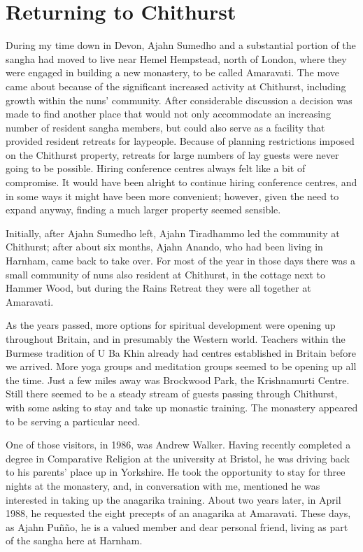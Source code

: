 \chapter{Returning to Chithurst}

During my time down in Devon, Ajahn Sumedho and a substantial portion of
the sangha had moved to live near Hemel Hempstead, north of London,
where they were engaged in building a new monastery, to be called
Amaravati\cite{amaravati}. The move came about because of the
significant increased activity at Chithurst,
including growth within the nuns' community. After considerable
discussion a decision was made to find another place that would not only
accommodate an increasing number of resident sangha members, but could
also serve as a facility that provided resident retreats for laypeople.
Because of planning restrictions imposed on the Chithurst
property, retreats for large numbers of lay guests were never going to
be possible. Hiring conference centres always felt like a bit of
compromise. It would have been alright to continue hiring conference
centres, and in some ways it might have been more convenient; however,
given the need to expand anyway, finding a much larger property seemed
sensible.

Initially, after Ajahn Sumedho left, Ajahn Tiradhammo led the community
at Chithurst; after about six months, Ajahn Anando, who had been living
in Harnham, came back to take over. For most of the year in those days
there was a small community of nuns also resident at Chithurst, in the
cottage next to Hammer Wood, but during the Rains Retreat they were all
together at Amaravati.

As the years passed, more options for spiritual development were opening
up throughout Britain, and in presumably the Western world. Teachers
within the Burmese tradition of U Ba Khin already had centres
established in Britain before we arrived. More yoga groups and
meditation groups seemed to be opening up all the time.
Just a few miles away was Brockwood Park,
the Krishnamurti Centre. Still there seemed
to be a steady stream of guests passing through Chithurst, with some
asking to stay and take up monastic training. The monastery appeared to
be serving a particular need.

One of those visitors, in 1986, was Andrew Walker. Having recently
completed a degree in Comparative Religion at the university at Bristol,
he was driving back to his parents' place up in Yorkshire. He took the
opportunity to stay for three nights at the monastery, and, in
conversation with me, mentioned he was interested in taking up the
anagarika training. About two years later, in April 1988, he requested
the eight precepts of an anagarika at Amaravati. These days, as Ajahn
Puñño, he is a valued member and dear personal friend, living as part of
the sangha here at Harnham.

